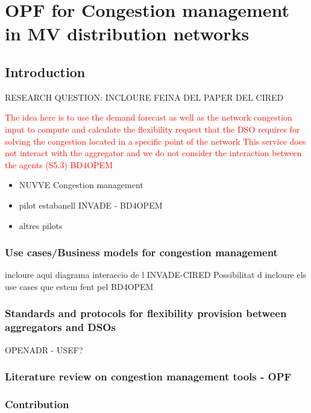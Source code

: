 \chapter{OPF for Congestion management in MV distribution networks}
\label{ChapterOPFDSO}

\section{Introduction}
RESEARCH QUESTION: INCLOURE FEINA DEL PAPER DEL CIRED

\textcolor{red}{The idea here is to use the demand forecast as well as the network congestion input to compute and calculate the flexibility request that the DSO requires for solving the congestion located in a specific point of the network}
\textcolor{red}{This service does not interact with the aggregator and we do not consider the interaction between the agents (S5.3) BD4OPEM}

\begin{itemize}
\item NUVVE Congestion management
\item pilot estabanell INVADE - BD4OPEM 
\item altres pilots
\end{itemize}

\subsection{Use cases/Business models for congestion management}
incloure aqui diagrama interaccio de l INVADE-CIRED
Possibilitat d incloure els use cases que estem fent pel BD4OPEM 

\subsection{Standards and protocols for flexibility provision between aggregators and DSOs}
OPENADR - USEF? 
\subsection{Literature review on congestion management tools - OPF}
\subsection{Contribution}


